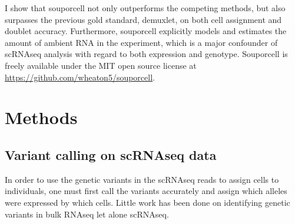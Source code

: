 \par{
I show that souporcell not only outperforms the competing methods, but also surpasses the previous gold standard, demuxlet, on both cell assignment and doublet accuracy. Furthermore, souporcell explicitly models and estimates the amount of ambient RNA in the experiment, which is a major confounder of scRNAseq analysis with regard to both expression and genotype. Souporcell is freely available under the MIT open source license at \href{https://github.com/wheaton5/souporcell}{https://github.com/wheaton5/souporcell}.
}


\section{Methods} %
\subsection{Variant calling on scRNAseq data}
In order to use the genetic variants in the scRNAseq reads to assign cells to individuals, one must first call the variants accurately and assign which alleles were expressed by which cells. Little work has been done on identifying genetic variants in bulk RNAseq\cite{RNAvariant}\cite{somaticrna} let alone scRNAseq\cite{vartrix}\cite{cellsnp}. 



